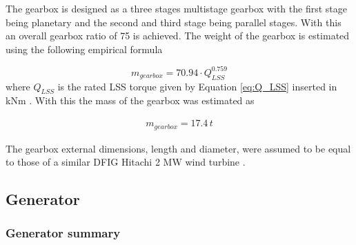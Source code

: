 The gearbox is designed as a three stages multistage gearbox with the first stage being planetary and the second and third stage being parallel stages. With this an overall gearbox ratio of 75 is achieved. 
The weight of the gearbox is estimated using the following empirical formula

\begin{equation}
    m_{gearbox} = 70.94 \cdot Q_{LSS}^{0.759}
\end{equation}
where $Q_{LSS}$ is the rated LSS torque given by Equation \ref{eq:Q_LSS} inserted in kNm \cite{Fingersh2006}. With this the mass of the gearbox was estimated as

\begin{align}
m_{gearbox} = 17.4 \, t
\end{align}

The gearbox external dimensions, length and diameter, were assumed to be equal to those of a similar DFIG Hitachi 2 MW wind turbine \cite{hitachi}.

\subsection{Generator}

\subsubsection{Generator summary}

